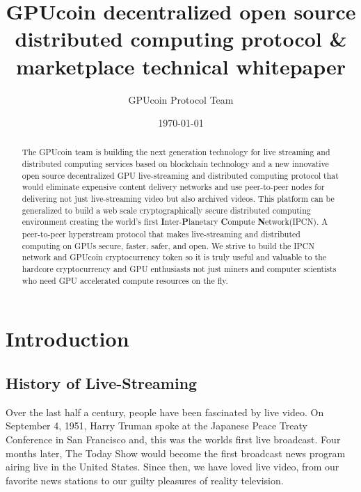\documentclass{article}
\title{GPUcoin decentralized 
open source distributed computing protocol \& marketplace technical whitepaper}
\author{GPUcoin Protocol Team}
\date{\today}
\begin{document}
\maketitle

\begin{abstract}
The GPUcoin team is building the next generation technology for live streaming and distributed computing services based on blockchain technology and a new innovative open source decentralized GPU live-streaming and distributed computing protocol that would eliminate expensive content delivery networks and use peer-to-peer nodes for delivering not just live-streaming video but also archived videos. This platform can be generalized to build a web scale cryptographically secure distributed computing environment creating the world's first \textbf{I}nter-\textbf{P}lanetary \textbf{C}ompute \textbf{N}etwork(IPCN). A peer-to-peer hyperstream protocol that makes live-streaming and distributed computing on GPUs secure, faster, safer, and open. We strive to build the IPCN network and GPUcoin cryptocurrency token so it is truly useful and valuable to the hardcore cryptocurrency and GPU enthusiasts not just miners and computer scientists who need GPU accelerated compute resources on the fly.

\end{abstract}
\newpage

\tableofcontents
\newpage

\section{Introduction}
\subsection{History of Live-Streaming}
Over the last half a century, people have been fascinated by live video. On September 4, 1951, Harry Truman spoke at the Japanese Peace Treaty Conference in San Francisco and, this was the worlds first live broadcast. Four months later, The Today Show would become the first broadcast news program airing live in the United States. Since then, we have loved live video, from our favorite news stations to our guilty pleasures of reality television.

\end{document}
